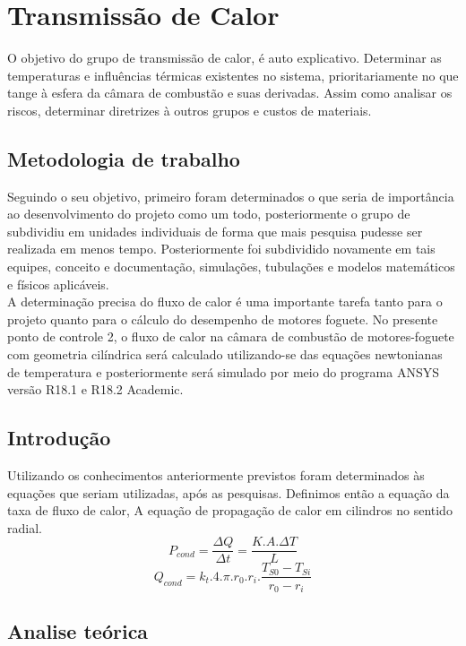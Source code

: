 \section{Transmissão de Calor}

O objetivo do grupo de transmissão de calor, é auto explicativo. Determinar as temperaturas e influências térmicas existentes no sistema, prioritariamente no que tange à esfera da câmara de combustão e suas derivadas. Assim como analisar os riscos, determinar diretrizes à outros grupos e custos de materiais.

\subsection{Metodologia de trabalho}

Seguindo o seu objetivo, primeiro foram determinados o que seria de importância ao desenvolvimento do projeto como um todo, posteriormente o grupo de subdividiu em unidades individuais de forma que mais pesquisa pudesse ser realizada em menos tempo. Posteriormente foi subdividido novamente em tais equipes, conceito e documentação, simulações, tubulações e modelos matemáticos e físicos aplicáveis.\\

A determinação precisa do fluxo de calor é uma importante tarefa tanto para o projeto quanto para o cálculo do desempenho de motores foguete. No presente ponto de controle 2, o fluxo de calor na câmara de combustão de motores-foguete com geometria cilíndrica será calculado utilizando-se das equações newtonianas de temperatura e posteriormente será simulado por meio do programa ANSYS versão R18.1 e R18.2 Academic.

\subsection{Introdução}

Utilizando os conhecimentos anteriormente previstos foram determinados às equações que seriam utilizadas, após as pesquisas. Definimos então a equação da taxa de fluxo de calor, A equação de propagação de calor em cilindros no sentido radial.\\
$$ P_{cond} = \frac{\Delta Q}{\Delta t} = \frac{K.A.\Delta T}{L}$$
$$ Q_{cond} = k_{t}.4.\pi.r_{0}.r_{i}.\frac{T_{S0}-T_{Si}}{r_{0}-r_{i}}$$

\subsection{Analise teórica}
